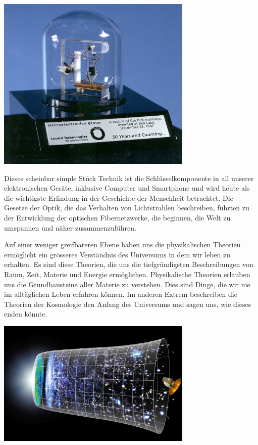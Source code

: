 \begin{marginfigure}
    \includegraphics[width=0.7\textwidth]{Bilder/transistor.jpg}
    \label{fig:transistor}
\end{marginfigure} 
Dieses scheinbar simple Stück Technik ist die Schlüsselkomponente in all unserer elektronischen Geräte, inklusive Computer und Smartphone und wird heute als die wichtigste Erfindung in der Geschichte der Menschheit betrachtet. Die Gesetze der Optik, die das Verhalten von Lichtstrahlen beschreiben, führten zu der Entwicklung der optischen Fibernetzwerke, die beginnen, die Welt zu umspannen und näher zusammenzuführen.

Auf einer weniger greifbareren Ebene haben uns die physikalischen Theorien ermöglicht ein grösseres Verständnis des Universums in dem wir leben zu erhalten. Es sind diese Theorien, die uns die tiefgründigsten Beschreibungen von Raum, Zeit, Materie und Energie ermöglichen. Physikalische Theorien erlauben uns die Grundbausteine aller Materie zu verstehen. Dies sind Dinge, die wir nie im alltäglichen Leben erfahren können. Im anderen Extrem beschreiben die Theorien der Kosmologie den Anfang des Universums und sagen uns, wie dieses enden könnte. 
\begin{marginfigure}
    \includegraphics[width=0.7\textwidth]{Bilder/wmap.jpg}
    \label{fig:wmap}
\end{marginfigure} 

